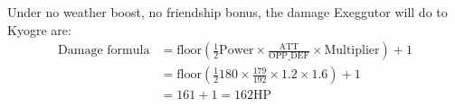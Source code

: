 \documentclass[12pt]{beamer}
\begin{document}
\begin{frame}
\begin{block}{}
\begin{footnotesize}
Under no weather boost, no friendship bonus, the damage Exeggutor will do to Kyogre are:
\begin{align*}
\text{Damage formula} & = \text{floor}\left(\frac{1}{2}\text{Power} \times \frac{\text{ATT}}{\text{OPP\_DEF}}\times\text{Multiplier}\right) +1  \\
& = \text{floor}\left(\frac{1}{2}\text{180} \times \frac{\text{179}}{\text{192}}\times\text{1.2}\times\text{1.6}\right) +1 \\
& = 161 + 1 = 162 \text{HP}
\end{align*}


\end{footnotesize}
\end{block}
\end{frame}
\end{document}
